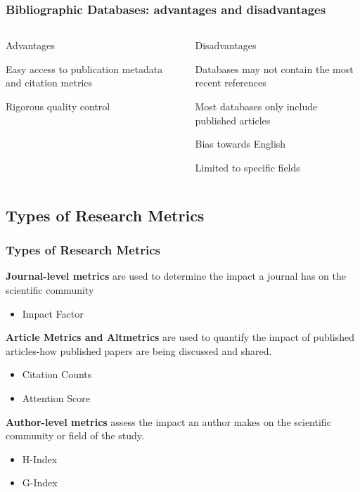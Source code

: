 \documentclass{beamer}
\begin{document}
\begin{frame}
    \frametitle{Bibliographic Databases: advantages and disadvantages }
    \begin{columns}[T]
        \begin{column}{.5\textwidth}
            \centering Advantages
            \begin{propslist}
                \item Easy access to publication metadata and citation metrics
                \pause
                \item Rigorous quality control \pause
            \end{propslist}
        \end{column}
        \begin{column}{.5\textwidth}
            \centering Disadvantages %
            \begin{conslist}
                \item Databases may not contain the most recent references \pause
                \item Most databases only include published articles \pause
                \item Bias towards English \pause
                \item Limited to specific fields \pause
            \end{conslist}
        \end{column}
    \end{columns}
\end{frame}
\subsection{Types of Research Metrics}
\begin{frame}
    \frametitle{Types of Research Metrics}
    \textbf{Journal-level metrics} are used to determine the impact a journal has on the scientific community
    \begin{itemize}
        \item Impact Factor
    \end{itemize}
    \textbf{Article Metrics and Altmetrics} are used to quantify the impact of published articles-how published papers are being discussed and shared.
    \begin{itemize}
        \item Citation Counts
        \item Attention Score
    \end{itemize}
    \textbf{Author-level metrics} assess the impact an author makes on the scientific community or field of the study.
    \begin{itemize}
        \item H-Index
        \item G-Index
    \end{itemize}

\end{frame}
\end{document}
